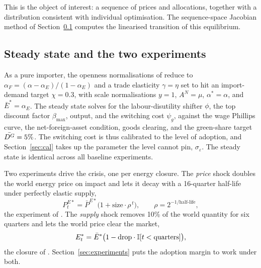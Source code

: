 This is the object of interest: a sequence of prices and allocations, together with a
distribution consistent with individual optimisation. The sequence-space Jacobian
method of Section~\ref{sec:ss} computes the linearised transition of this
equilibrium.

\subsection{Steady state and the two experiments}\label{sec:ss}

As a pure importer, the openness normalisations of \citet{ARS2024} reduce to
$\alpha_F=(\alpha-\alpha_E)/(1-\alpha_E)$ and a trade elasticity $\gamma=\eta$ set
to hit an import-demand target $\chi=0.3$, with scale normalisations $y=1$,
$A^N=\mu$, $\alpha^{*}=\alpha$, and $\bar E^{*}=\alpha_E$. The steady
state solves for the labour-disutility shifter $\phi$, the top discount factor
$\beta_{\max}$, output, and the switching cost $\psi_g$, against the wage Phillips
curve, the net-foreign-asset condition, goods clearing, and the green-share target
$\bar{D^{G}}=5\%$. The switching cost is thus calibrated to the level of adoption, and
Section~\ref{sec:cal} takes up the parameter the level cannot pin,
$\sigma_\varepsilon$. The steady state is identical across all baseline
experiments.

Two experiments drive the crisis, one per energy closure. The \emph{price} shock
doubles the world energy price on impact and lets it decay with a 16-quarter
half-life under perfectly elastic supply,
%
\begin{equation}
P^{E*}_t=\bar P^{E*}\bigl(1+\text{size}\cdot\rho^{\,t}\bigr),
\qquad
\rho=2^{-1/\text{half-life}},
\label{eq:price-shock}
\end{equation}
%
the experiment of \citet{ARS2024}. The \emph{supply} shock removes 10\% of the
world quantity for six quarters and lets the world price clear the market,
%
\begin{equation}
E^{*}_t=\bar E^{*}
\bigl(1-\text{drop}\cdot\mathbb{I}[t<\text{quarters}]\bigr),
\label{eq:supply-shock}
\end{equation}
%
the closure of \citet{Bayer2026}. Section~\ref{sec:experiments} puts the adoption
margin to work under both.
